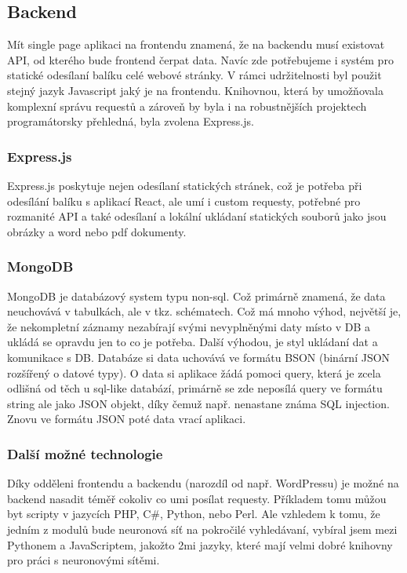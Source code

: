 \subsection{Backend}
Mít single page aplikaci na frontendu znamená, že na backendu musí existovat API,
od kterého bude frontend čerpat data.
Navíc zde potřebujeme i systém pro statické odesílaní balíku celé webové stránky.
V rámci udržitelnosti byl použit stejný jazyk Javascript jaký je na frontendu.
Knihovnou, která by umožňovala komplexní správu requestů a zároveň by byla
i na robustnějších projektech programátorsky přehledná, byla zvolena Express.js.

\subsubsection{Express.js}
Express.js poskytuje nejen odesílaní statických stránek,
což je potřeba při odesílání balíku s aplikací React, ale umí i
custom requesty, potřebné pro rozmanité API a také odesílaní a
lokální ukládaní statických souborů jako jsou obrázky a word nebo pdf dokumenty.

\subsubsection{MongoDB}
MongoDB je databázový system typu non-sql.
Což primárně znamená, že data neuchovává v tabulkách, ale v tkz. schématech.
Což má mnoho výhod, největší je, že nekompletní záznamy nezabírají
svými nevyplněnými daty místo v DB a ukládá se opravdu jen to co je potřeba.
Další výhodou, je styl ukládaní dat a komunikace s DB.
Databáze si data uchovává ve formátu BSON (binární JSON rozšířený o datové typy).
O data si aplikace žádá pomoci query,
která je zcela odlišná od těch u sql-like databází,
primárně se zde neposílá query ve formátu string ale jako JSON objekt,
díky čemuž např. nenastane známa SQL injection.
Znovu ve formátu JSON poté data vrací aplikaci.

\subsubsection{Další možné technologie}
Díky odděleni frontendu a backendu (narozdíl od např. WordPressu) je možné
na backend nasadit téměř cokoliv co umi posílat requesty.
Příkladem tomu můžou byt scripty v jazycích PHP, C\#, Python, nebo Perl.
Ale vzhledem k tomu, že jedním z modulů bude neuronová síť na pokročilé vyhledávaní,
vybíral jsem mezi Pythonem a JavaScriptem, jakožto 2mi jazyky, které
mají velmi dobré knihovny pro práci s neuronovými sítěmi.

